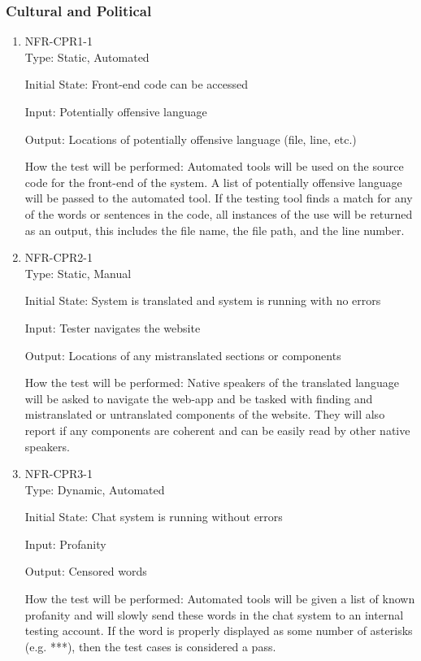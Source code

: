 \documentclass[12pt, titlepage]{article}
\begin{document}
\subsubsection{Cultural and Political}

\begin{enumerate}

\item{NFR-CPR1-1}\\

Type: Static, Automated

Initial State: Front-end code can be accessed

Input: Potentially offensive language

Output: Locations of potentially offensive language (file, line, etc.)

How the test will be performed: Automated tools will be used on the source code for the front-end of the system. A list of potentially offensive language will be passed to the automated tool. If the testing tool finds a match for any of the words or sentences in the code, all instances of the use will be returned as an output, this includes the file name, the file path, and the line number.

\item{NFR-CPR2-1}\\

Type: Static, Manual

Initial State: System is translated and system is running with no errors

Input: Tester navigates the website

Output: Locations of any mistranslated sections or components

How the test will be performed: Native speakers of the translated language will be asked to navigate the web-app and be tasked with finding and mistranslated or untranslated components of the website. They will also report if any components are coherent and can be easily read by other native speakers.

\item{NFR-CPR3-1}\\

Type: Dynamic, Automated

Initial State: Chat system is running without errors

Input: Profanity

Output: Censored words

How the test will be performed: Automated tools will be given a list of known profanity and will slowly send these words in the chat system to an internal testing account. If the word is properly displayed as some number of asterisks (e.g. ***), then the test cases is considered a pass.

\end{enumerate}
\end{document}
